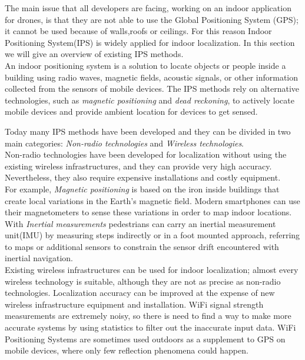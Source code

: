 The main issue that all developers are facing, working on an indoor application for drones, is that they are not able to use the Global Positioning System (GPS); it cannot be used because of walls,roofs or ceilings.
For this reason Indoor Positioning System(IPS) is widely applied for indoor localization. In this section we will give an overview of existing IPS methods.  
\\

An indoor positioning system is a solution to locate objects or people inside a building using radio waves, magnetic fields, acoustic signals, or other information collected from the sensors of mobile devices.
The IPS methods rely on alternative technologies, such as \textit{magnetic positioning} and \textit{dead reckoning}, to actively locate mobile devices and provide ambient location for devices to get sensed.

Today many IPS methods have been developed and they can be divided in two main categories: \textit{Non-radio technologies} and \textit{Wireless technologies}.
\\

Non-radio technologies have been developed for localization without using the existing wireless infrastructures, and they can provide very high accuracy.
Nevertheless, they also require expensive installations and costly equipment.
\\

For example, \textit{Magnetic positioning}\cite{magnetic} is based on the iron inside buildings that create local variations in the Earth’s magnetic field.
Modern smartphones can use their magnetometers to sense these variations in order to map indoor locations.
\\

With \textit{Inertial measurements}\cite{IMU} pedestrians can carry an inertial measurement unit(IMU) by measuring steps indirectly or in a foot mounted approach, referring to maps or additional sensors to constrain the sensor drift encountered with inertial navigation.
\\

Existing wireless infrastructures can be used for indoor localization; almost every wireless technology is suitable, although they are not as precise as non-radio technologies.
Localization accuracy can be improved at the expense of new wireless infrastructure equipment and installation.
WiFi signal strength measurements are extremely noisy, so there is need to find a way to make more accurate systems by using statistics to filter out the inaccurate input data. WiFi Positioning Systems are sometimes used outdoors as a supplement to GPS on mobile devices, where only few reflection phenomena could happen.
\\


